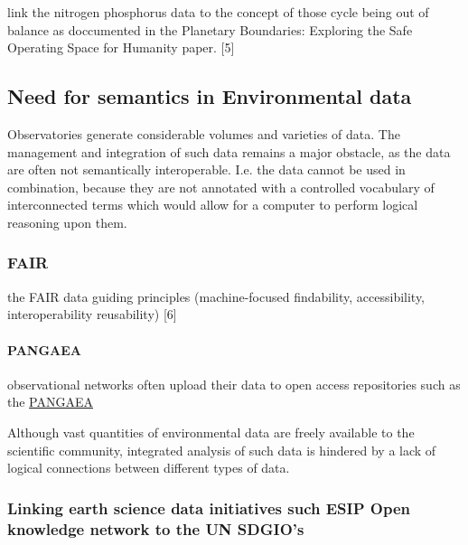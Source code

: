 \documentclass[]{article}
\let\oldparagraph\paragraph
\renewcommand{\paragraph}[1]{\oldparagraph{#1}\mbox{}}
\begin{document}
link the nitrogen phosphorus data to the concept of those cycle being
out of balance as doccumented in the Planetary Boundaries: Exploring the
Safe Operating Space for Humanity paper. {[}5{]}

\hypertarget{need-for-semantics-in-environmental-data}{%
\subsection{Need for semantics in Environmental
data}\label{need-for-semantics-in-environmental-data}}

Observatories generate considerable volumes and varieties of data. The
management and integration of such data remains a major obstacle, as the
data are often not semantically interoperable. I.e. the data cannot be
used in combination, because they are not annotated with a controlled
vocabulary of interconnected terms which would allow for a computer to
perform logical reasoning upon them.

\hypertarget{fair}{%
\subsubsection{FAIR}\label{fair}}

the FAIR data guiding principles (machine-focused findability,
accessibility, interoperability reusability) {[}6{]}

\hypertarget{pangaea}{%
\paragraph{PANGAEA}\label{pangaea}}

observational networks often upload their data to open access
repositories such as the \href{https://pangaea.de/}{PANGAEA}

Although vast quantities of environmental data are freely available to
the scientific community, integrated analysis of such data is hindered
by a lack of logical connections between different types of data.

\hypertarget{linking-earth-science-data-initiatives-such-esip-open-knowledge-network-to-the-un-sdgios}{%
\subsubsection{Linking earth science data initiatives such ESIP Open
knowledge network to the UN
SDGIO's}\label{linking-earth-science-data-initiatives-such-esip-open-knowledge-network-to-the-un-sdgios}}
\end{document}
